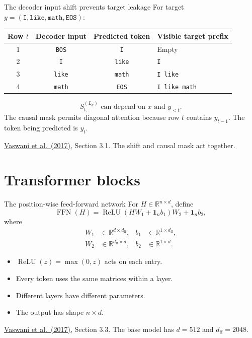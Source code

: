 \documentclass[aspectratio=169,11pt]{beamer}
\newcommand{\R}{\mathbb{R}}
\newcommand{\one}{\mathbf{1}}
\newcommand{\src}[1]{\par\vfill{\fontsize{7}{8.5}\selectfont\color{muted}#1}\par}
\newcommand{\paper}{\href{https://arxiv.org/abs/1706.03762}{Vaswani et al.\ (2017)}}
\DeclareMathOperator{\FFN}{FFN}
\begin{document}
\begin{frame}[t]{The decoder input shift prevents target leakage}
For target $y=(\texttt{I},\texttt{like},\texttt{math},\texttt{EOS})$:
\begin{center}
\begin{tabular}{@{}cccl@{}}
\toprule
Row $t$ & Decoder input & Predicted token & Visible target prefix \\
\midrule
1 & \texttt{BOS} & \texttt{I} & Empty \\
2 & \texttt{I} & \texttt{like} & \texttt{I} \\
3 & \texttt{like} & \texttt{math} & \texttt{I like} \\
4 & \texttt{math} & \texttt{EOS} & \texttt{I like math} \\
\bottomrule
\end{tabular}
\end{center}
\[S^{(L_d)}_{t,:}\text{ can depend on }x\text{ and }y_{<t}.\]
The causal mask permits diagonal attention because row $t$ contains
$y_{t-1}$. The token being predicted is $y_t$.
\src{\paper, Section 3.1. The shift and causal mask act together.}
\end{frame}

\section{Transformer blocks}
\begin{frame}[t]{The position-wise feed-forward network}
For $H\in\R^{n\times d}$, define
\[
 \FFN(H)=\operatorname{ReLU}(HW_1+\one_n b_1)W_2+\one_n b_2,
\]
where
\[
\begin{aligned}
 W_1&\in\R^{d\times d_{\mathrm{ff}}},&b_1&\in\R^{1\times d_{\mathrm{ff}}},\\
 W_2&\in\R^{d_{\mathrm{ff}}\times d},&b_2&\in\R^{1\times d}.
\end{aligned}
\]
\begin{itemize}
  \item $\operatorname{ReLU}(z)=\max(0,z)$ acts on each entry.
  \item Every token uses the same matrices within a layer.
  \item Different layers have different parameters.
  \item The output has shape $n\times d$.
\end{itemize}
\src{\paper, Section 3.3. The base model has $d=512$ and $d_{\mathrm{ff}}=2048$.}
\end{frame}
\end{document}
